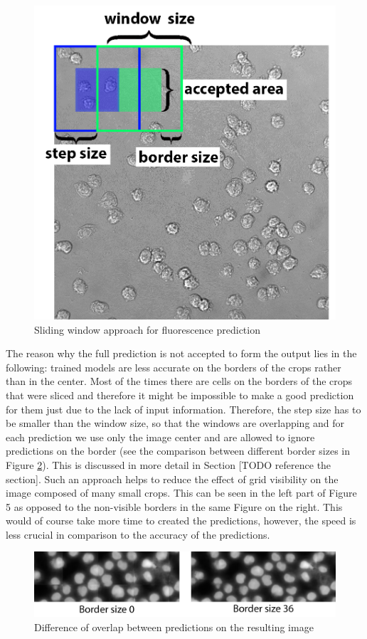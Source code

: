 \begin{figure}[H]
	\begin{center}
		\includegraphics[width=0.3\linewidth]{bilder/sliding-window.png}
		\caption{Sliding window approach for fluorescence prediction}\label{fig:sliding-window}
	\end{center}
\end{figure}
The reason why the full prediction is not accepted to form the output lies in the following: trained models are less accurate on the borders of the crops rather than in the center. Most of the times there are cells on the borders of the crops that were sliced and therefore it might be impossible to make a good prediction for them just due to the lack of input information. Therefore, the step size has to be smaller than the window size, so that the windows are overlapping and for each prediction we use only the image center and are allowed to ignore predictions on the border (see the comparison between different border sizes in Figure \ref{fig:crops-combination}). This is discussed in more detail in Section [TODO reference the section]. Such an approach helps to reduce the effect of grid visibility on the image composed of many small crops. This can be seen in the left part of Figure 5 as opposed to the non-visible borders in the same Figure on the right. This would of course take more time to created the predictions, however, the speed is less crucial in comparison to the accuracy of the predictions.

\begin{figure}[htb]
	\begin{center}
		\includegraphics[width=\linewidth]{bilder/crops_combination/crops-combination.png}
		\caption{Difference of overlap between predictions on the resulting image}\label{fig:crops-combination}
	\end{center}
\end{figure}